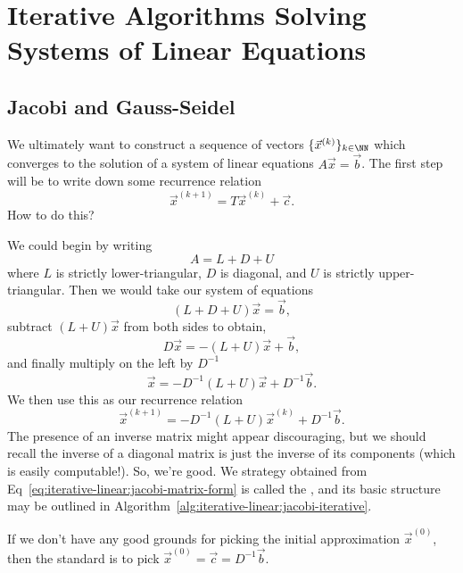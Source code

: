 \chapter{Iterative Algorithms Solving Systems of Linear Equations}

\section{Jacobi and Gauss-Seidel}

We ultimately want to construct a sequence of vectors
$\{\vec{x}^{(k)}\}_{k\in\NN}$ which converges to the solution of a
system of linear equations $A\vec{x}=\vec{b}$. The first step will be to
write down some recurrence relation
\begin{equation}
\vec{x}^{(k+1)}=T\vec{x}^{(k)}+\vec{c}.
\end{equation}
How to do this?

We could begin by writing
\begin{equation}
A = L + D + U
\end{equation}
where $L$ is strictly lower-triangular, $D$ is diagonal, and $U$ is
strictly upper-triangular. Then we would take our system of equations
\begin{equation}
(L+D+U)\vec{x}=\vec{b},
\end{equation}
subtract $(L+U)\vec{x}$ from both sides to obtain,
\begin{equation}
D\vec{x}=-(L+U)\vec{x}+\vec{b},
\end{equation}
and finally multiply on the left by $D^{-1}$
\begin{equation}
\vec{x}=-D^{-1}(L+U)\vec{x}+D^{-1}\vec{b}.
\end{equation}
We then use this as our recurrence relation
\begin{equation}\label{eq:iterative-linear:jacobi-matrix-form}
\vec{x}^{(k+1)}=-D^{-1}(L+U)\vec{x}^{(k)}+D^{-1}\vec{b}.
\end{equation}
The presence of an inverse matrix might appear discouraging, but we
should recall the inverse of a diagonal matrix is just the inverse of
its components (which is easily computable!). So, we're good. We
strategy obtained from Eq~\eqref{eq:iterative-linear:jacobi-matrix-form}
is called the , and its basic structure may be
outlined in Algorithm~\ref{alg:iterative-linear:jacobi-iterative}.

If we don't have any good grounds for picking the initial approximation
$\vec{x}^{(0)}$, then the standard is to pick $\vec{x}^{(0)}=\vec{c}=D^{-1}\vec{b}$.

